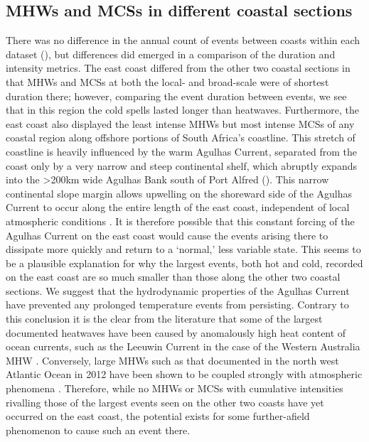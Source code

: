 \documentclass[a4paper,10pt,review]{elsarticle}
\begin{document}
\subsection{MHWs and MCSs in different coastal sections}
There was no difference in the annual count of events between coasts within each dataset (), but differences did emerged in a comparison of the duration and intensity metrics. The east coast differed from the other two coastal sections in that MHWs and MCSs at both the local- and broad-scale were of shortest duration there; however, comparing the event duration between events, we see that in this region the cold spells lasted longer than heatwaves. Furthermore, the east coast also displayed the least intense MHWs but most intense MCSs of any coastal region along offshore portions of South Africa's coastline. This stretch of coastline is heavily influenced by the warm Agulhas Current, separated from the coast only by a very narrow and steep continental shelf, which abruptly expands into the >200km wide Agulhas Bank south of Port Alfred (). This narrow continental slope margin allows upwelling on the shoreward side of the Agulhas Current to occur along the entire length of the east coast, independent of local atmospheric conditions \citep{Lutjeharms2000}. It is therefore possible that this constant forcing of the Agulhas Current on the east coast would cause the events arising there to dissipate more quickly and return to a `normal,' less variable state. This seems to be a plausible explanation for why the largest events, both hot and cold, recorded on the east coast are so much smaller than those along the other two coastal sections. We suggest that the hydrodynamic properties of the Agulhas Current have prevented any prolonged temperature events from persisting. Contrary to this conclusion it is the clear from the literature that some of the largest documented heatwaves have been caused by anomalously high heat content of ocean currents, such as the Leeuwin Current in the case of the Western Australia MHW \citep{Feng2013, Pearce2013, Wernberg2013}. Conversely, large MHWs such as that documented in the north west Atlantic Ocean in 2012 have been shown to be coupled strongly with atmospheric phenomena \citep{Mills2012, Chen2014, Chen2015}. Therefore, while no MHWs or MCSs with cumulative intensities rivalling those of the largest events seen on the other two coasts have yet occurred on the east coast, the potential exists for some further-afield phenomenon to cause such an event there.
\end{document}
